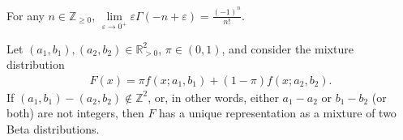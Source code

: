 \documentclass[10pt,a4paper]{amsart}
\begin{document}
\begin{lemma}\label{lem:1}
    For any $n\in\mathbb{Z}_{\geq 0}$, $\lim\limits_{\varepsilon\to 0^+} \varepsilon \Gamma(-n+\varepsilon) = \frac{(-1)^n}{n!}$.
\end{lemma}

\begin{theorem} \label{th:1}
    Let $(a_1,b_1),(a_2,b_2) \in \mathbb{R}^2_{>0}$, $\pi \in (0,1)$, and consider the mixture distribution
    \begin{align*}
        F(x) = \pi f(x;a_1,b_1)+(1-\pi)f(x;a_2,b_2).
    \end{align*}
    If $(a_1,b_1)-(a_2,b_2) \notin \mathbb{Z}^2$, or, in other words, either $a_1-a_2$ or $b_1-b_2$ (or both) are not integers, then $F$ has a unique representation as a mixture of two Beta distributions.
\end{theorem}
\end{document}
